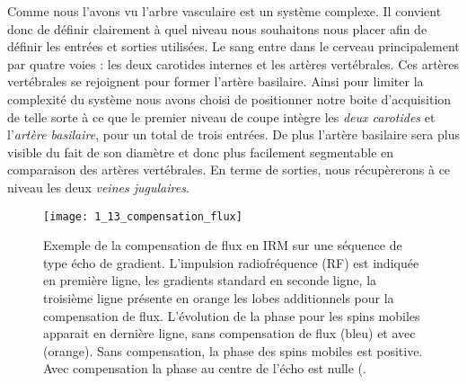 Comme nous l’avons vu l’arbre vasculaire est un système complexe. Il convient donc de définir clairement à quel niveau nous souhaitons nous placer afin de définir les entrées et sorties utilisées. Le sang entre dans le cerveau principalement par quatre voies : les deux carotides internes et les artères vertébrales. Ces artères vertébrales se rejoignent pour former l’artère basilaire. Ainsi pour limiter la complexité du système nous avons choisi de positionner notre boite d’acquisition de telle sorte à ce que le premier niveau de coupe intègre les {\em deux carotides} et l’{\em artère basilaire}, pour un total de trois entrées. De plus l’artère basilaire sera plus visible du fait de son diamètre et donc plus facilement segmentable en comparaison des artères vertébrales. En terme de sorties, nous récupèrerons à ce niveau les deux {\em veines jugulaires}.\\
\begin{figure}[!t]
\centering
\texttt{[image: 1\_13\_compensation\_flux]}
\caption{Exemple de la compensation de flux en IRM sur une séquence de type écho de gradient. L'impulsion radiofréquence (RF) est indiquée en première ligne, les gradients standard en seconde ligne, la troisième ligne présente en orange les lobes additionnels pour la compensation de flux. L'évolution de la phase pour les spins mobiles apparait en dernière ligne, sans compensation de flux (bleu) et avec (orange). Sans compensation, la phase des spins mobiles est positive. Avec compensation la phase au centre de l'écho est nulle (\cite{flowcompensation}. }
\label{fig:1_13_compensation_flux}	
\end{figure}

